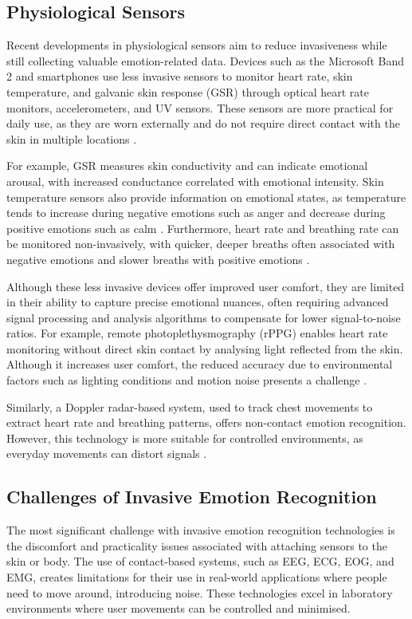 \subsection{Physiological Sensors}
Recent developments in physiological sensors aim to reduce invasiveness while still collecting valuable emotion-related data. Devices such as the Microsoft Band 2 and smartphones use less invasive sensors to monitor heart rate, skin temperature, and galvanic skin response (GSR) through optical heart rate monitors, accelerometers, and UV sensors. These sensors are more practical for daily use, as they are worn externally and do not require direct contact with the skin in multiple locations \cite{Younis2022-bs}.

For example, GSR measures skin conductivity and can indicate emotional arousal, with increased conductance correlated with emotional intensity. Skin temperature sensors also provide information on emotional states, as temperature tends to increase during negative emotions such as anger and decrease during positive emotions such as calm \cite{Nawasalkar2017-fx}. Furthermore, heart rate and breathing rate can be monitored non-invasively, with quicker, deeper breaths often associated with negative emotions and slower breaths with positive emotions \cite{Younis2022-bs}. 

Although these less invasive devices offer improved user comfort, they are limited in their ability to capture precise emotional nuances, often requiring advanced signal processing and analysis algorithms to compensate for lower signal-to-noise ratios. For example, remote photoplethysmography (rPPG) enables heart rate monitoring without direct skin contact by analysing light reflected from the skin. Although it increases user comfort, the reduced accuracy due to environmental factors such as lighting conditions and motion noise presents a challenge \cite{Dzedzickis2020-hf}.

Similarly, a Doppler radar-based system, used to track chest movements to extract heart rate and breathing patterns, offers non-contact emotion recognition. However, this technology is more suitable for controlled environments, as everyday movements can distort signals \cite{Lubecke-4751478}.

\subsection{Challenges of Invasive Emotion Recognition}
The most significant challenge with invasive emotion recognition technologies is the discomfort and practicality issues associated with attaching sensors to the skin or body. The use of contact-based systems, such as EEG, ECG, EOG, and EMG, creates limitations for their use in real-world applications where people need to move around, introducing noise. These technologies excel in laboratory environments where user movements can be controlled and minimised. 

